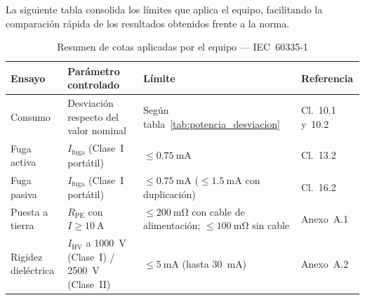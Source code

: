 La siguiente tabla consolida los límites que aplica el equipo,
facilitando la comparación rápida de los resultados obtenidos frente
a la norma.

\begin{table}[H]
\centering
\caption{Resumen de cotas aplicadas por el equipo --- IEC~60335-1}
\label{tab:resumen_cotas}
\renewcommand{\arraystretch}{1.4}
\small
\begin{tabular}{@{} l p{3.6cm} p{5.2cm} l @{}}
\toprule
\textbf{Ensayo}
    & \textbf{Parámetro controlado}
    & \textbf{Límite}
    & \textbf{Referencia} \\
\midrule
Consumo
    & Desviación respecto del valor nominal
    & Según tabla~\ref{tab:potencia_desviacion}
    & Cl.~10.1 y~10.2 \\
Fuga activa
    & $I_{\text{fuga}}$ (Clase~I portátil)
    & $\leq \SI{0.75}{\milli\ampere}$
    & Cl.~13.2 \\
Fuga pasiva
    & $I_{\text{fuga}}$ (Clase~I portátil)
    & $\leq \SI{0.75}{\milli\ampere}$
      ($\leq \SI{1.5}{\milli\ampere}$ con duplicación)
    & Cl.~16.2 \\
Puesta a tierra
    & $R_{\text{PE}}$ con $I \geq \SI{10}{\ampere}$
    & $\leq \SI{200}{\milli\ohm}$ con cable de alimentación;
      $\leq \SI{100}{\milli\ohm}$ sin cable
    & Anexo~A.1 \\
Rigidez dieléctrica
    & $I_{\text{HV}}$ a \SI{1000}{\volt} (Clase~I) / \SI{2500}{\volt} (Clase~II)
    & $\leq \SI{5}{\milli\ampere}$ (hasta \SI{30}{\milli\ampere})
    & Anexo~A.2 \\
\bottomrule
\end{tabular}
\end{table}

